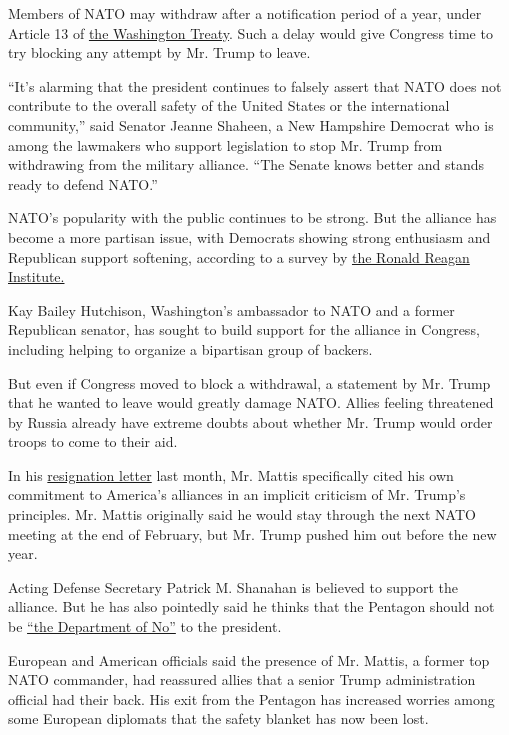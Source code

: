 Members of NATO may withdraw after a notification period of a year,
under Article 13 of
\href{https://www.nato.int/cps/ie/natohq/official_texts_17120.htm}{the
Washington Treaty}. Such a delay would give Congress time to try
blocking any attempt by Mr. Trump to leave.

``It's alarming that the president continues to falsely assert that NATO
does not contribute to the overall safety of the United States or the
international community,'' said Senator Jeanne Shaheen, a New Hampshire
Democrat who is among the lawmakers who support legislation to stop Mr.
Trump from withdrawing from the military alliance. ``The Senate knows
better and stands ready to defend NATO.''

NATO's popularity with the public continues to be strong. But the
alliance has become a more partisan issue, with Democrats showing strong
enthusiasm and Republican support softening, according to a survey by
\href{https://www.reaganfoundation.org/reagan-institute/centers/peace-through-strength/}{the
Ronald Reagan Institute.}

Kay Bailey Hutchison, Washington's ambassador to NATO and a former
Republican senator, has sought to build support for the alliance in
Congress, including helping to organize a bipartisan group of backers.

But even if Congress moved to block a withdrawal, a statement by Mr.
Trump that he wanted to leave would greatly damage NATO. Allies feeling
threatened by Russia already have extreme doubts about whether Mr. Trump
would order troops to come to their aid.

In his
\href{https://www.nytimes.com/2018/12/20/us/politics/letter-jim-mattis-trump.html}{resignation
letter} last month, Mr. Mattis specifically cited his own commitment to
America's alliances in an implicit criticism of Mr. Trump's principles.
Mr. Mattis originally said he would stay through the next NATO meeting
at the end of February, but Mr. Trump pushed him out before the new
year.

Acting Defense Secretary Patrick M. Shanahan is believed to support the
alliance. But he has also pointedly said he thinks that the Pentagon
should not be
\href{https://www.nytimes.com/2018/12/24/us/politics/patrick-shanahan-defense-secretary.html}{``the
Department of No''} to the president.

European and American officials said the presence of Mr. Mattis, a
former top NATO commander, had reassured allies that a senior Trump
administration official had their back. His exit from the Pentagon has
increased worries among some European diplomats that the safety blanket
has now been lost.

